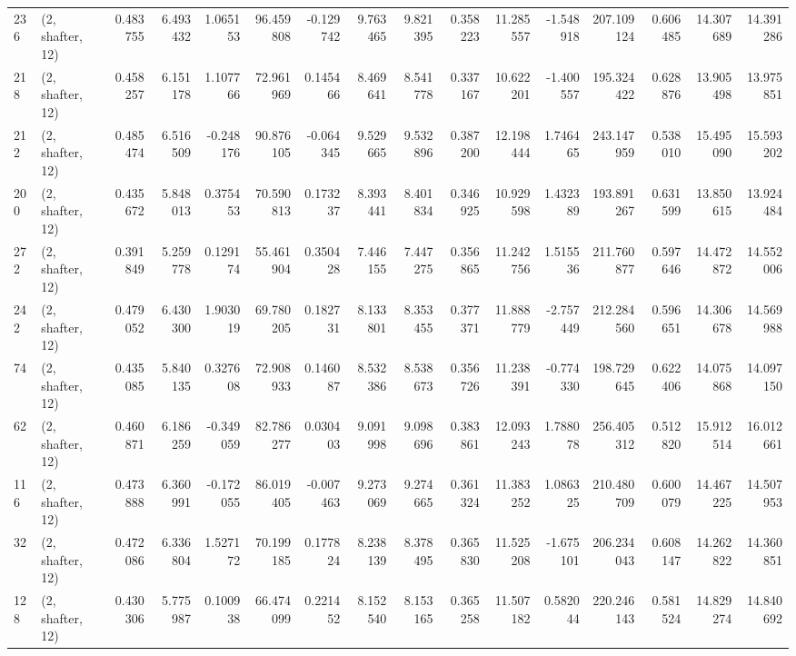 \begin{tabular}{llrrrrrrrrrrrrrr}
236 &  (2, shafter, 12) &   0.483755 &   6.493432 &   1.065153 &    96.459808 &  -0.129742 &   9.763465 &   9.821395 &  0.358223 &  11.285557 &  -1.548918 &    207.109124 &    0.606485 &   14.307689 &   14.391286 \\
218 &  (2, shafter, 12) &   0.458257 &   6.151178 &   1.107766 &    72.961969 &   0.145466 &   8.469641 &   8.541778 &  0.337167 &  10.622201 &  -1.400557 &    195.324422 &    0.628876 &   13.905498 &   13.975851 \\
212 &  (2, shafter, 12) &   0.485474 &   6.516509 &  -0.248176 &    90.876105 &  -0.064345 &   9.529665 &   9.532896 &  0.387200 &  12.198444 &   1.746465 &    243.147959 &    0.538010 &   15.495090 &   15.593202 \\
200 &  (2, shafter, 12) &   0.435672 &   5.848013 &   0.375453 &    70.590813 &   0.173237 &   8.393441 &   8.401834 &  0.346925 &  10.929598 &   1.432389 &    193.891267 &    0.631599 &   13.850615 &   13.924484 \\
272 &  (2, shafter, 12) &   0.391849 &   5.259778 &   0.129174 &    55.461904 &   0.350428 &   7.446155 &   7.447275 &  0.356865 &  11.242756 &   1.515536 &    211.760877 &    0.597646 &   14.472872 &   14.552006 \\
242 &  (2, shafter, 12) &   0.479052 &   6.430300 &   1.903019 &    69.780205 &   0.182731 &   8.133801 &   8.353455 &  0.377371 &  11.888779 &  -2.757449 &    212.284560 &    0.596651 &   14.306678 &   14.569988 \\
74  &  (2, shafter, 12) &   0.435085 &   5.840135 &   0.327608 &    72.908933 &   0.146087 &   8.532386 &   8.538673 &  0.356726 &  11.238391 &  -0.774330 &    198.729645 &    0.622406 &   14.075868 &   14.097150 \\
62  &  (2, shafter, 12) &   0.460871 &   6.186259 &  -0.349059 &    82.786277 &   0.030403 &   9.091998 &   9.098696 &  0.383861 &  12.093243 &   1.788078 &    256.405312 &    0.512820 &   15.912514 &   16.012661 \\
116 &  (2, shafter, 12) &   0.473888 &   6.360991 &  -0.172055 &    86.019405 &  -0.007463 &   9.273069 &   9.274665 &  0.361324 &  11.383252 &   1.086325 &    210.480709 &    0.600079 &   14.467225 &   14.507953 \\
32  &  (2, shafter, 12) &   0.472086 &   6.336804 &   1.527172 &    70.199185 &   0.177824 &   8.238139 &   8.378495 &  0.365830 &  11.525208 &  -1.675101 &    206.234043 &    0.608147 &   14.262822 &   14.360851 \\
128 &  (2, shafter, 12) &   0.430306 &   5.775987 &   0.100938 &    66.474099 &   0.221452 &   8.152540 &   8.153165 &  0.365258 &  11.507182 &   0.582044 &    220.246143 &    0.581524 &   14.829274 &   14.840692 \\

\end{tabular}
